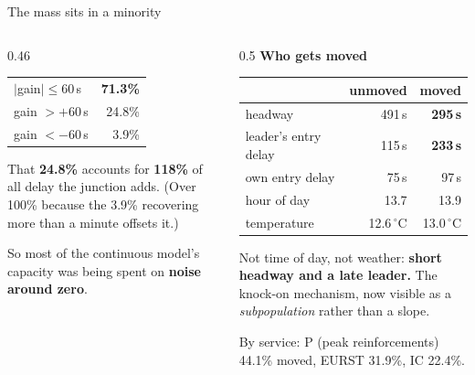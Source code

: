 \documentclass[aspectratio=169,10pt]{beamer}
\newcommand{\srcnote}[1]{{\scriptsize\color{ink3}#1}}
\newcommand{\hl}[1]{{\color{corange}\textbf{#1}}}
\begin{document}
\begin{frame}{The mass sits in a minority}
  \begin{columns}[T]
    \begin{column}{0.46\textwidth}
      \begin{tabular}{@{}lr@{}}
        \toprule
        $|$gain$| \leq 60$\,s & \textbf{71.3\%} \\
        gain $> +60$\,s & 24.8\% \\
        gain $< -60$\,s & 3.9\% \\
        \bottomrule
      \end{tabular}

      \vspace{0.8em}
      That \textbf{24.8\%} accounts for \hl{118\%} of all delay the junction adds.
      \srcnote{(Over 100\% because the 3.9\% recovering more than a minute offsets it.)}

      \vspace{0.8em}
      So most of the continuous model's capacity was being spent on \textbf{noise around
      zero}.
    \end{column}
    \begin{column}{0.5\textwidth}
      \textbf{Who gets moved}

      \vspace{0.3em}
      \small
      \begin{tabular}{@{}lrr@{}}
        \toprule
        & unmoved & moved \\
        \midrule
        headway & 491\,s & \textbf{295\,s} \\
        leader's entry delay & 115\,s & \textbf{233\,s} \\
        own entry delay & 75\,s & 97\,s \\
        hour of day & 13.7 & 13.9 \\
        temperature & 12.6\,$^\circ$C & 13.0\,$^\circ$C \\
        \bottomrule
      \end{tabular}

      \vspace{0.7em}
      Not time of day, not weather: \hl{short headway and a late leader.} The knock-on
      mechanism, now visible as a \emph{subpopulation} rather than a slope.

      \vspace{0.4em}
      \srcnote{By service: P (peak reinforcements) 44.1\% moved, EURST 31.9\%, IC 22.4\%.}
    \end{column}
  \end{columns}
\end{frame}
\end{document}
